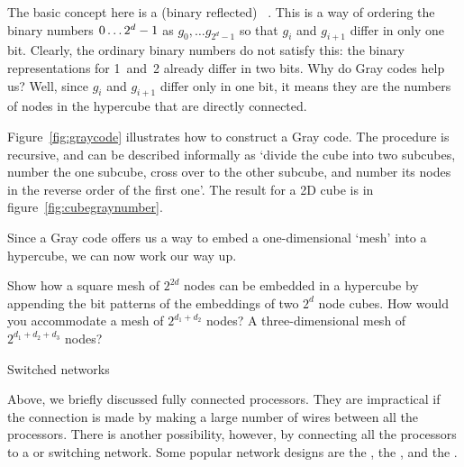 \begin{notlulu}
  \graycodepicture
\end{notlulu}
%
The basic concept here is a (binary reflected) ~\cite{Gray:graycodepatent}. This is a way of ordering the
binary numbers $0\ldots2^d-\nobreak1$ as $g_0,\ldots g_{2^d-1}$ so that $g_i$
and $g_{i+1}$ differ in only one bit. Clearly, the ordinary binary
numbers do not satisfy this: the binary representations for 1~and~2
already differ in two bits. Why do Gray codes help us? Well, since
$g_i$ and $g_{i+1}$ differ only in one bit, it means they are the
numbers of nodes in the hypercube that are directly connected.

Figure~\ref{fig:graycode} illustrates how to construct a Gray
code. The procedure is recursive, and can be described informally as
`divide the cube into two subcubes, number the one subcube, cross over
to the other subcube, and number its nodes in the reverse order of the
first one'. The result for a 2D cube is in figure~\ref{fig:cubegraynumber}.

Since a Gray code offers us a way to embed a one-dimensional `mesh'
into a hypercube, we can now work our way up.
\begin{exercise}
  Show how a square mesh of $2^{2d}$ nodes can be embedded in a
  hypercube by appending the bit patterns of the embeddings of two
  $2^d$ node cubes. How would you accommodate a mesh of $2^{d_1+d_2}$
  nodes? A three-dimensional mesh of $2^{d_1+d_2+d_3}$ nodes?
\end{exercise}

 {Switched networks}
\label{sec:crossbar}

\def\crossbarfig{
\begin{wrapfigure}{r}{2.5in}%
  \texttt{[image: crossbar]}
  \caption{A simple cross bar connecting 6 inputs to 6 outputs.}
  \label{fig:crossbar}
\end{wrapfigure}
}

Above, we briefly discussed fully connected processors. They are
impractical if the connection is made by making a large number of
wires between all the processors. There is another possibility,
however, by connecting all the processors to a  or
switching network. Some popular network designs are the
, the , and the
.

